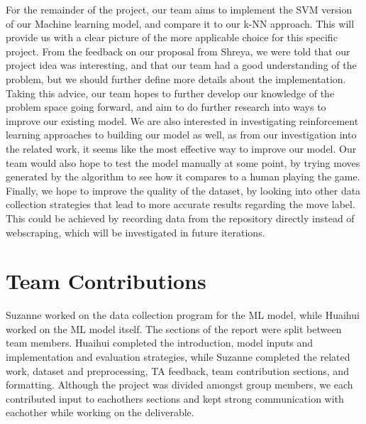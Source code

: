 \documentclass[11pt]{article}
\begin{document}
For the remainder of the project, our team aims to implement the SVM version of our Machine learning model, and compare it to our k-NN approach. This will provide us with a clear picture of the more applicable choice for this specific project. From the feedback on our proposal from Shreya, we were told that our project idea was interesting, and that our team had a good understanding of the problem, but we should further define more details about the implementation. Taking this advice, our team hopes to further develop our knowledge of the problem space going forward, and aim to do further research into ways to improve our existing model. We are also interested in investigating reinforcement learning approaches to building our model as well, as from our investigation into the related work, it seems like the most effective way to improve our model. Our team would also hope to test the model manually at some point, by trying moves generated by the algorithm to see how it compares to a human playing the game. Finally, we hope to improve the quality of the dataset, by looking into other data collection strategies that lead to more accurate results regarding the move label. This could be achieved by recording data from the repository directly instead of webscraping, which will be investigated in future iterations. 

\section*{Team Contributions}

Suzanne worked on the data collection program for the ML model, while Huaihui worked on the ML model itself. The sections of the report were split between team members. Huaihui completed the introduction, model inputs and implementation and evaluation strategies, while Suzanne completed the related work, dataset and preprocessing, TA feedback, team contribution sections, and formatting. Although the project was divided amongst group members, we each contributed input to eachothers sections and kept strong communication with eachother while working on the deliverable.

%





\end{document}
